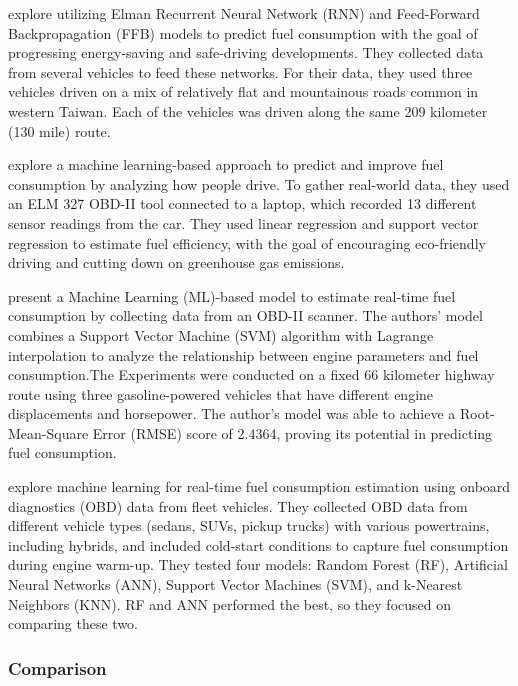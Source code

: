 \documentclass[letterpaper]{article}
\begin{document}
\cite{yen_combining_2021} explore utilizing Elman Recurrent Neural Network (RNN) and 
Feed-Forward Backpropagation (FFB) models to predict fuel consumption with the goal of 
progressing energy-saving and safe-driving developments. They collected data from several 
vehicles to feed these networks. For their data, they used three vehicles driven on a mix of 
relatively flat and mountainous roads common in western Taiwan. Each of the vehicles was driven
along the same 209 kilometer (130 mile) route. 

\cite{Manjunath2024} explore a machine learning-based approach to predict and improve fuel 
consumption by analyzing how people drive. To gather real-world data, they used an ELM 327
OBD-II tool connected to a laptop, which recorded 13 different sensor readings from the car. 
They used linear regression and support vector regression to estimate fuel efficiency, with the 
goal of encouraging eco-friendly driving and cutting down on greenhouse gas emissions. 

\cite{abukhalil2020fuel} present a Machine Learning (ML)-based model to estimate real-time 
fuel consumption by collecting data from an OBD-II scanner. The authors' model combines a 
Support Vector Machine (SVM) algorithm with Lagrange interpolation to analyze the relationship
between engine parameters and fuel consumption.The Experiments were conducted on a fixed 66 
kilometer highway route using three gasoline-powered vehicles that have different engine 
displacements and horsepower. The author's model was able to achieve a Root-Mean-Square Error 
(RMSE) score of 2.4364, proving its potential in predicting fuel consumption. 

\cite{abediasl2024real} explore machine learning for real-time fuel consumption estimation 
using onboard diagnostics (OBD) data from fleet vehicles. They collected OBD data from 
different vehicle types (sedans, SUVs, pickup trucks) with various powertrains, including 
hybrids, and included cold-start conditions to capture fuel consumption during engine warm-up. 
They tested four models: Random Forest (RF), Artificial Neural Networks (ANN), Support Vector 
Machines (SVM), and k-Nearest Neighbors (KNN). RF and ANN performed the best, so they focused 
on comparing these two. 

\subsubsection*{Comparison}~\\
\end{document}
